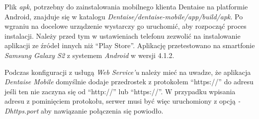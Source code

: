 \documentclass[11pt]{aghdpl}
\begin{document}
Plik \emph{apk}, potrzebny do zainstalowania mobilnego klienta Dentaise na platformie Android, znajduje się w katalogu \emph{Dentaise/dentaise-mobile/app/build/apk}. Po wgraniu na docelowe urządzenie wystarczy go uruchomić, aby rozpocząć proces instalacji. Należy przed tym w ustawieniach telefonu zezwolić na instalowanie aplikacji ze źródeł innych niż ``Play Store''. Aplikację przetestowano na smartfonie \emph{Samsung Galaxy S2} z systemem \emph{Android} w wersji 4.1.2.

Podczas konfiguracji z usługą \emph{Web Service'u} należy mieć na uwadze, że aplikacja \emph{Dentaise Mobile} domyślnie dodaje przedrostek z protokołem ``https://'' do adresu jeśli ten nie zaczyna się od ``http://'' lub ``https://''. W przypadku wpisania adresu z pominięciem protokołu, serwer musi być więc uruchomiony z opcją \emph{-Dhttps.port} aby nawiązanie połączenia się powiodło.

% 
% 



\end{document}
